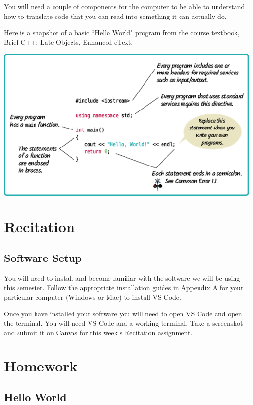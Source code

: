 You will need a couple of components for the computer to be able to understand how to translate code that you can read into something it can actually do. 

Here is a snapshot of a basic ``Hello World" program from the course textbook,  Brief C++: Late Objects, Enhanced eText. 

\includegraphics[width=\textwidth]{images/hello_world_16.png}

\section{Recitation}
\subsection{Software Setup}
You will need to install and become familiar with the software we will be using this semester. Follow the appropriate installation guides in Appendix A for your particular computer (Windows or Mac) to install VS Code. 

Once you have installed your software you will need to open VS Code and open the terminal. You will need VS Code and a working terminal. Take a screenshot and submit it on Canvas for this week's Recitation assignment. 

\section{Homework}

\subsection{Hello World}


